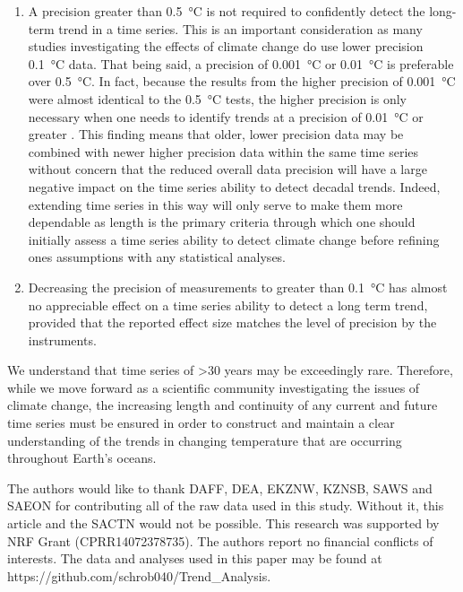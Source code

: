 \documentclass{ametsoc}
\begin{document}
\begin{enumerate}
\item A precision greater than \SI{0.5}{\degreeCelsius} is not required to confidently detect the long-term trend in a time series. This is an important consideration as many studies investigating the effects of climate change \citep[e.g.][]{Grant2010, Scherrer2010, Lathlean2012} do use lower precision \SI{0.1}{\degreeCelsius} data. That being said, a precision of \SI{0.001}{\degreeCelsius} or \SI{0.01}{\degreeCelsius} is preferable over \SI{0.5}{\degreeCelsius}. In fact, because the results from the higher precision of \SI{0.001}{\degreeCelsius} were almost identical to the \SI{0.5}{\degreeCelsius} tests, the higher precision is only necessary when one needs to identify trends at a precision of \SI{0.01}{\degreeCelsius} or greater \citep{Karl2015}. This finding means that older, lower precision data may be combined with newer higher precision data within the same time series without concern that the reduced overall data precision will have a large negative impact on the time series ability to detect decadal trends. Indeed, extending time series in this way will only serve to make them more dependable as length is the primary criteria through which one should initially assess a time series ability to detect climate change before refining ones assumptions with any statistical analyses.

\item Decreasing the precision of measurements to greater than \SI{0.1}{\degreeCelsius} has almost no appreciable effect on a time series ability to detect a long term trend, provided that the reported effect size matches the level of precision by the instruments.
\end{enumerate}

We understand that time series of >30 years may be exceedingly rare. Therefore, while we move forward as a scientific community investigating the issues of climate change, the increasing length and continuity of any current and future time series must be ensured in order to construct and maintain a clear understanding of the trends in changing temperature that are occurring throughout Earth's oceans.

%

\acknowledgments
The authors would like to thank DAFF, DEA, EKZNW, KZNSB, SAWS and SAEON for contributing all of the raw data used in this study. Without it, this article and the SACTN would not be possible. This research was supported by NRF Grant (CPRR14072378735). The authors report no financial conflicts of interests. The data and analyses used in this paper may be found at https://github.com/schrob040/Trend_Analysis.
\end{document}
